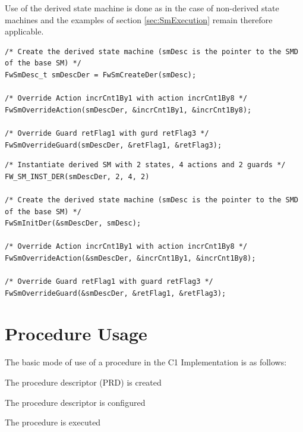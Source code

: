 \documentclass[manual]{../fwprofile}
\begin{document}
Use of the derived state machine is done as in the case of non-derived state machines and the examples of section \ref{sec:SmExecution} 
remain therefore applicable.


\begin{lstlisting}
/* Create the derived state machine (smDesc is the pointer to the SMD of the base SM) */
FwSmDesc_t smDescDer = FwSmCreateDer(smDesc);

/* Override Action incrCnt1By1 with action incrCnt1By8 */
FwSmOverrideAction(smDescDer, &incrCnt1By1, &incrCnt1By8);

/* Override Guard retFlag1 with gurd retFlag3 */
FwSmOverrideGuard(smDescDer, &retFlag1, &retFlag3);
\end{lstlisting}

\noindent\begin{minipage}{\textwidth}
\begin{lstlisting}
/* Instantiate derived SM with 2 states, 4 actions and 2 guards */
FW_SM_INST_DER(smDescDer, 2, 4, 2)

/* Create the derived state machine (smDesc is the pointer to the SMD of the base SM) */
FwSmInitDer(&smDescDer, smDesc);

/* Override Action incrCnt1By1 with action incrCnt1By8 */
FwSmOverrideAction(&smDescDer, &incrCnt1By1, &incrCnt1By8);

/* Override Guard retFlag1 with guard retFlag3 */
FwSmOverrideGuard(&smDescDer, &retFlag1, &retFlag3);
\end{lstlisting}
\end{minipage}

\section{Procedure Usage}\label{sec:prUsage}

The basic mode of use of a procedure in the C1 Implementation is as follows:

\begin{fw_itemize}
\item The procedure descriptor (PRD) is created
\item The procedure descriptor is configured
\item The procedure is executed
\end{fw_itemize}
\end{document}
